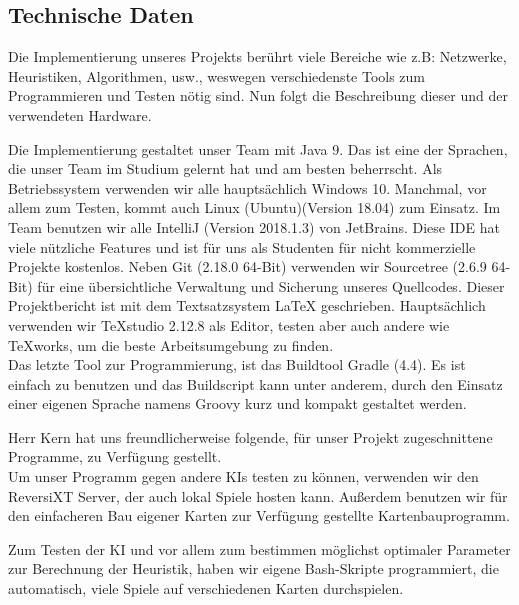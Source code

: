 \documentclass[12pt,a4paper,bibliography=totocnumbered,listof=totocnumbered]{scrartcl}
\begin{document}
    \subsection{Technische Daten}
    \vspace{1em}
	Die Implementierung unseres Projekts berührt viele Bereiche wie z.B: Netzwerke, Heuristiken, Algorithmen, usw., weswegen verschiedenste Tools zum Programmieren und Testen nötig sind. Nun folgt die Beschreibung dieser und der verwendeten Hardware.
	
    Die Implementierung gestaltet unser Team mit Java 9. Das ist eine der Sprachen, die unser Team im Studium gelernt hat und am besten beherrscht. Als Betriebssystem verwenden wir alle hauptsächlich Windows 10. Manchmal, vor allem zum Testen, kommt auch Linux (Ubuntu)(Version 18.04) zum Einsatz. Im Team benutzen wir alle IntelliJ (Version 2018.1.3) von JetBrains. Diese IDE hat viele nützliche Features und ist für uns als Studenten für nicht kommerzielle Projekte kostenlos. Neben Git (2.18.0 64-Bit) verwenden wir Sourcetree (2.6.9 64-Bit) für eine übersichtliche Verwaltung und Sicherung unseres Quellcodes. Dieser Projektbericht ist mit dem Textsatzsystem LaTeX geschrieben. Hauptsächlich verwenden wir TeXstudio 2.12.8 als Editor, testen aber auch andere wie TeXworks, um die beste Arbeitsumgebung zu finden.\\
    Das letzte Tool zur Programmierung, ist das Buildtool Gradle (4.4). Es ist einfach zu benutzen und das Buildscript kann unter anderem, durch den Einsatz einer eigenen Sprache namens Groovy kurz und kompakt gestaltet werden. 

	Herr Kern hat uns freundlicherweise folgende, für unser Projekt zugeschnittene Programme, zu Verfügung gestellt.\\
    Um unser Programm gegen andere KIs testen zu können, verwenden wir den ReversiXT Server, der auch lokal Spiele hosten kann. Außerdem benutzen wir für den einfacheren Bau eigener Karten zur Verfügung gestellte Kartenbauprogramm.
    
    Zum Testen der KI und vor allem zum bestimmen möglichst optimaler Parameter zur Berechnung der Heuristik, haben wir eigene Bash-Skripte programmiert, die automatisch, viele Spiele auf verschiedenen Karten durchspielen. 
\end{document}
